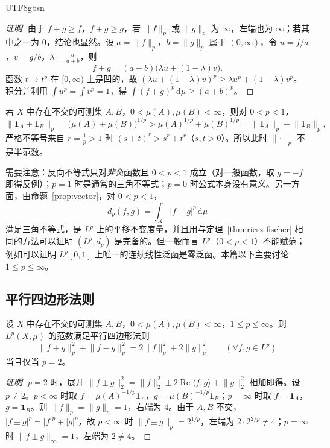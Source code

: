 \documentclass[11pt]{article}
\newcommand{\norm}[1]{\lVert #1\rVert}
\newcommand{\dmu}{\,\mathrm{d}\mu}
\newcommand{\ind}{\mathbf{1}}
\begin{document}
\begin{CJK*}{UTF8}{gbsn}
\begin{proof}[证明]
由于 $f+g\ge f$，$f+g\ge g$，若 $\norm{f}_{p}$ 或 $\norm{g}_{p}$ 为 $\infty$，左端也为 $\infty$；若其中之一为 $0$，结论也显然。设 $a=\norm{f}_{p}$，$b=\norm{g}_{p}$ 属于 $(0,\infty)$，令 $u=f/a$，$v=g/b$，$\lambda=\frac{a}{a+b}$，则
\[
f+g=(a+b)\bigl(\lambda u+(1-\lambda)v\bigr).
\]
函数 $t\mapsto t^{p}$ 在 $[0,\infty)$ 上是凹的，故 $(\lambda u+(1-\lambda)v)^{p}\ge\lambda u^{p}+(1-\lambda)v^{p}$。积分并利用 $\int u^{p}=\int v^{p}=1$，得 $\int(f+g)^{p}\dmu\ge(a+b)^{p}$。
\end{proof}

\begin{example}\label{ex:p-less-1-L}
若 $X$ 中存在不交的可测集 $A,B$，$0<\mu(A),\mu(B)<\infty$，则对 $0<p<1$，
\[
\norm{\ind_{A}+\ind_{B}}_{p}=\bigl(\mu(A)+\mu(B)\bigr)^{1/p}>\mu(A)^{1/p}+\mu(B)^{1/p}=\norm{\ind_{A}}_{p}+\norm{\ind_{B}}_{p},
\]
严格不等号来自 $r=\frac1p>1$ 时 $(s+t)^{r}>s^{r}+t^{r}$（$s,t>0$）。所以此时 $\norm{\cdot}_{p}$ 不是半范数。
\end{example}

\begin{remark}
需要注意：反向不等式只对\emph{非负}函数且 $0<p<1$ 成立（对一般函数，取 $g=-f$ 即得反例）；$p=1$ 时是通常的三角不等式；$p=0$ 时公式本身没有意义。另一方面，由命题~\ref{prop:vector}，对 $0<p<1$，
\[
d_{p}(f,g)=\int_{X}|f-g|^{p}\dmu
\]
满足三角不等式，是 $L^{p}$ 上的平移不变度量，并且用与定理~\ref{thm:riesz-fischer} 相同的方法可以证明 $(L^{p},d_{p})$ 是完备的。但一般而言 $L^{p}$（$0<p<1$）不能赋范；例如可以证明 $L^{p}[0,1]$ 上唯一的连续线性泛函是零泛函。本篇以下主要讨论 $1\le p\le\infty$。
\end{remark}

\subsection{平行四边形法则}

\begin{proposition}\label{prop:parallelogram}
设 $X$ 中存在不交的可测集 $A,B$，$0<\mu(A),\mu(B)<\infty$，$1\le p\le\infty$。则 $L^{p}(X,\mu)$ 的范数满足平行四边形法则
\[
\norm{f+g}_{p}^{2}+\norm{f-g}_{p}^{2}=2\norm{f}_{p}^{2}+2\norm{g}_{p}^{2}\qquad(\forall f,g\in L^{p})
\]
当且仅当 $p=2$。
\end{proposition}

\begin{proof}[证明]
$p=2$ 时，展开 $\norm{f\pm g}_{2}^{2}=\norm{f}_{2}^{2}\pm2\operatorname{Re}\langle f,g\rangle+\norm{g}_{2}^{2}$ 相加即得。设 $p\ne2$。$p<\infty$ 时取 $f=\mu(A)^{-1/p}\ind_{A}$，$g=\mu(B)^{-1/p}\ind_{B}$；$p=\infty$ 时取 $f=\ind_{A}$，$g=\ind_{B}$。则 $\norm{f}_{p}=\norm{g}_{p}=1$，右端为 $4$。由于 $A,B$ 不交，$|f\pm g|^{p}=|f|^{p}+|g|^{p}$，故 $p<\infty$ 时 $\norm{f\pm g}_{p}=2^{1/p}$，左端为 $2\cdot2^{2/p}\ne4$；$p=\infty$ 时 $\norm{f\pm g}_{\infty}=1$，左端为 $2\ne4$。
\end{proof}


\end{CJK*}
\end{document}
